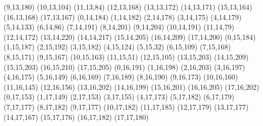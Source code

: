 (9,13,180) (10,13,104) (11,13,84) (12,13,168) (13,13,172) (14,13,171) (15,13,164) (16,13,168) (17,13,167) (0,14,184) (1,14,182) (2,14,178) (3,14,175) (4,14,179) (5,14,133) (6,14,86) (7,14,191) (8,14,201) (9,14,204) (10,14,191) (11,14,79) (12,14,172) (13,14,220) (14,14,217) (15,14,205) (16,14,209) (17,14,200) (0,15,184) (1,15,187) (2,15,192) (3,15,182) (4,15,124) (5,15,32) (6,15,109) (7,15,168) (8,15,171) (9,15,167) (10,15,163) (11,15,51) (12,15,105) (13,15,203) (14,15,209) (15,15,203) (16,15,210) (17,15,205) (0,16,191) (1,16,198) (2,16,203) (3,16,197) (4,16,175) (5,16,149) (6,16,169) (7,16,189) (8,16,190) (9,16,173) (10,16,160) (11,16,145) (12,16,156) (13,16,202) (14,16,199) (15,16,201) (16,16,205) (17,16,202) (0,17,153) (1,17,149) (2,17,153) (3,17,155) (4,17,173) (5,17,182) (6,17,179) (7,17,177) (8,17,182) (9,17,177) (10,17,182) (11,17,185) (12,17,179) (13,17,177) (14,17,167) (15,17,176) (16,17,182) (17,17,180)
